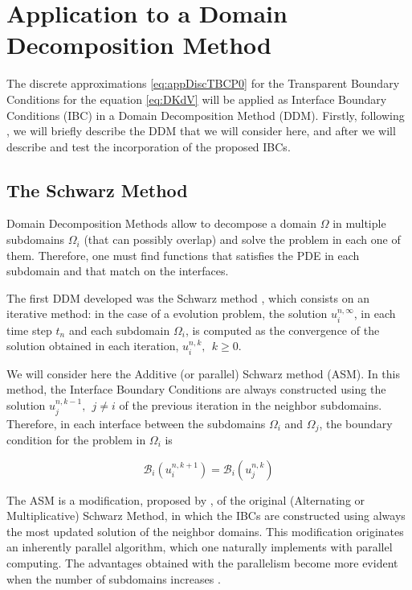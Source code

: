 \section{Application to a Domain Decomposition Method}
\label{sec:DDM}

\indent The discrete approximations \eqref{eq:appDiscTBCP0} for the Transparent Boundary Conditions for the equation \eqref{eq:DKdV} will be applied as Interface Boundary Conditions (IBC) in a Domain Decomposition Method (DDM). Firstly, following \cite{Japhet2003}, we will briefly describe the DDM that we will consider here, and after we will describe and test the incorporation of the proposed IBCs.

\subsection{The Schwarz Method}

\indent Domain Decomposition Methods allow to decompose a domain $\Omega$ in multiple subdomains $\Omega_i$ (that can possibly overlap) and solve the problem in each one of them. Therefore, one must find functions that satisfies the PDE in each subdomain and that match on the interfaces. 

\indent The first DDM developed was the Schwarz method \cite{Japhet2003,Gander2008}, which consists on an iterative method: in the case of a evolution problem, the solution  $u_i^{n,\infty}$, in each time step $t_n$ and each subdomain $\Omega_i$, is computed as the convergence of the solution obtained in each iteration, $u_i^{n,k}, \ \ k\geq 0$.

\indent We will consider here the Additive (or parallel) Schwarz method (ASM). In this method, the Interface Boundary Conditions are always constructed using the solution $u_j^{n,k-1}, \ \ j \neq i$ of the previous iteration in the neighbor subdomains. Therefore, in each interface between the subdomains $\Omega_i$ and $\Omega_j$, the boundary condition for the problem in $\Omega_i$ is

\begin{equation}
	\label{eq:genericIBC}
\mathcal{B}_i(u_i^{n,k+1}) = \mathcal{B}_i(u_j^{n,k})
\end{equation}

\indent The ASM is a modification, proposed by \cite{Lions1988}, of the original (Alternating or Multiplicative) Schwarz Method, in which the IBCs are constructed using always the most updated solution of the neighbor domains. This modification originates an inherently parallel algorithm, which one naturally implements with parallel computing. The advantages obtained with the parallelism become more evident when the number of subdomains increases \cite{Lions1988}.

